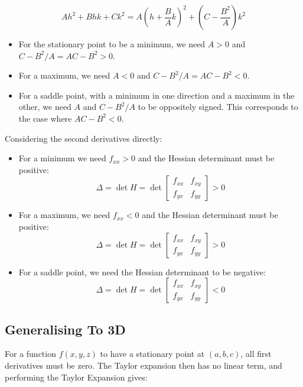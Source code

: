 \[
    Ah^2 + Bhk + Ck^2 = A \left(h + \frac{B}{A}k\right)^2 + \left(C - \frac{B^2}{A}\right)k^2
\]

\begin{itemize}
    \item For the stationary point to be a minimum, we need $A > 0$ and $C - B^2 / A = AC - B^2 > 0$.
    \item For a maximum, we need $A < 0$ and $C-B^2/A = AC-B^2 < 0$.
    \item For a saddle point, with a minimum in one direction and a maximum in the other, we need $A$ and $C - B^2/A$ to be oppositely signed. This corresponds to the case where $AC - B^2 < 0$.
\end{itemize}

Considering the second derivatives directly:
\begin{itemize}
    \item For a minimum we need $f_{xx} > 0$ and the Hessian determinant must be positive:
    \[
        \Delta = \det H = \det \begin{bmatrix}
            f_{xx} & f_{xy} \\
            f_{yx} & f_{yy}
        \end{bmatrix} > 0
    \]

    \item For a maximum, we need $f_{xx} < 0$ and the Hessian determinant must be positive:
    \[
        \Delta = \det H = \det \begin{bmatrix}
            f_{xx} & f_{xy} \\
            f_{yx} & f_{yy}
        \end{bmatrix} > 0
    \]
    
    \item For a saddle point, we need the Hessian determinant to be negative:
    \[
        \Delta = \det H = \det \begin{bmatrix}
            f_{xx} & f_{xy} \\
            f_{yx} & f_{yy}
        \end{bmatrix} < 0
    \] 
\end{itemize}

\subsection{Generalising To 3D}
For a function $f(x, y, z)$ to have a stationary point at $(a, b, c)$, all first 
derivatives must be zero. The Taylor expansion then has no linear term, and performing the Taylor Expansion gives:

